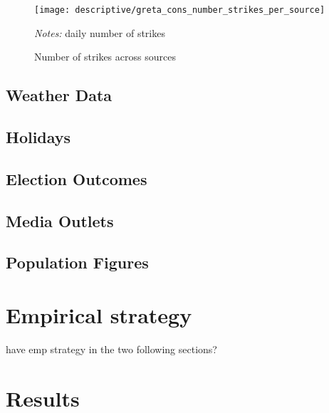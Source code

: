 \documentclass[11pt, a4paper]{article} %
\begin{document}
\begin{figure}[H]\centering
	\caption{Number of strikes across sources}\label{fig_greta_cons:number_strikes_per_source}
	\texttt{[image: descriptive/greta\_cons\_number\_strikes\_per\_source]}
	\begin{minipage}{0.8\linewidth}
		\scriptsize{\emph{Notes:} daily number of strikes}
	\end{minipage}
\end{figure}


\subsection{Weather Data}


\subsection{Holidays}


\subsection{Election Outcomes}


\subsection{Media Outlets}


\subsection{Population Figures}




\newpage
\section{Empirical strategy}\label{sec_greta_cons:empirical_strategy}

have emp strategy in the two following sections?


\newpage
\section{Results}\label{sec_greta_cons:results}
\end{document}
